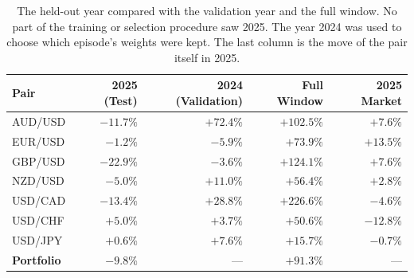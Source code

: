 \begin{table}[htb!]
\centering
\footnotesize
\caption{The held-out year compared with the validation year and the full window. No part of the training or selection procedure saw 2025. The year 2024 was used to choose which episode's weights were kept. The last column is the move of the pair itself in 2025.}
\label{Tables:TestYear}
\begin{tabular}{@{}lrrrr@{}}
\toprule
\textbf{Pair} & \textbf{2025 (Test)} & \textbf{2024 (Validation)} & \textbf{Full Window} & \textbf{2025 Market} \\
\midrule
AUD/USD & $-11.7\%$ & $+72.4\%$ & $+102.5\%$ & $+7.6\%$ \\
EUR/USD & $-1.2\%$ & $-5.9\%$ & $+73.9\%$ & $+13.5\%$ \\
GBP/USD & $-22.9\%$ & $-3.6\%$ & $+124.1\%$ & $+7.6\%$ \\
NZD/USD & $-5.0\%$ & $+11.0\%$ & $+56.4\%$ & $+2.8\%$ \\
USD/CAD & $-13.4\%$ & $+28.8\%$ & $+226.6\%$ & $-4.6\%$ \\
USD/CHF & $\mathbf{+5.0\%}$ & $+3.7\%$ & $+50.6\%$ & $-12.8\%$ \\
USD/JPY & $+0.6\%$ & $+7.6\%$ & $+15.7\%$ & $-0.7\%$ \\
\midrule
\textbf{Portfolio} & $\mathbf{-9.8\%}$ & --- & $+91.3\%$ & --- \\
\bottomrule
\end{tabular}
\end{table}
